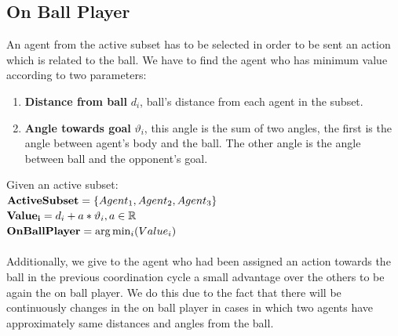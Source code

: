 \subsection{On Ball Player}
An agent from the active subset has to be selected in order to be sent an action which is related to the ball. We have to find the agent who has minimum value according to two parameters:
\begin{enumerate}
\item \textbf{Distance from ball} $d_{i}$, ball's distance from each agent in the subset. 
\item \textbf{Angle towards goal} $\vartheta_{i}$, this angle is the sum of two angles, the first is the angle between agent's body and the ball. The other angle is the angle between ball and the opponent's goal.
\end{enumerate}
Given an active subset:\\
${\bf ActiveSubset} = \lbrace Agent_{1},Agent_{2},Agent_{3} \rbrace $\\
${\bf Value_{i}} = d_{i} + a \ast \vartheta_{i}, a\in\mathbb{R}$\\
${\bf OnBallPlayer} = \arg\min_{i}(Value_{i}) $\\
\\Additionally, we give to the agent who had been assigned an action towards the ball in the previous coordination cycle a small
advantage over the others to be again the on ball player. We do this due to the fact that there will be continuously changes in the on ball player in cases in which two agents have approximately same distances and angles from the ball.
